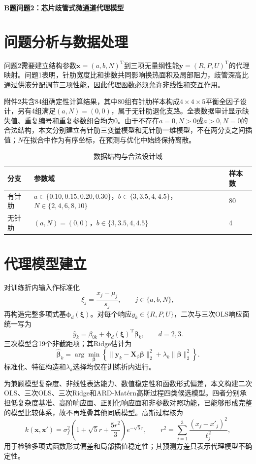 \documentclass[UTF8,12pt,a4paper]{ctexart}
\begin{document}
\setcounter{section}{9}

\begin{center}
{\LARGE\bfseries\color{navy} B题问题2：芯片歧管式微通道代理模型}
\end{center}

\section{问题分析与数据处理}
问题2需要建立结构参数$\bm x=(a,b,N)^{\mathrm T}$到三项无量纲性能$\bm y=(R,P,U)^{\mathrm T}$的代理映射。问题1表明，针肋宽度比和排数共同影响换热面积及局部阻力，歧管深高比通过供液分配调节三项性能，因此代理函数必须允许非线性和交互作用。

附件2共含84组确定性计算结果，其中80组有针肋样本构成$4\times4\times5$平衡全因子设计，另有4组满足$(a,N)=(0,0)$，属于无针肋退化支路。全表数据审计显示缺失值、重复编号和重复参数组合均为0。由于不存在$a=0,N>0$或$a>0,N=0$的合法结构，本文分别建立有针肋三变量模型和无针肋一维模型，不在两分支之间插值；$N$在拟合中作为有序坐标，在预测与优化中始终保持离散。

\begin{table}[H]\centering\small
\caption{数据结构与合法设计域}\label{tab:domain}
\begin{tabular}{lll}
\toprule
分支 & 参数域 & 样本数 \\
\midrule
有针肋 & $a\in\{0.10,0.15,0.20,0.30\}$，$b\in\{3,3.5,4,4.5\}$，$N\in\{2,4,6,8,10\}$ & 80 \\
无针肋 & $(a,N)=(0,0)$，$b\in\{3,3.5,4,4.5\}$ & 4 \\
\bottomrule
\end{tabular}
\end{table}

\section{代理模型建立}
对训练折内输入作标准化
\[
\xi_j=\frac{x_j-\mu_j}{s_j},\qquad j\in\{a,b,N\},
\]
再构造完整多项式基$\bm\phi_d(\bm\xi)$。对每个响应$y_k\in\{R,P,U\}$，二次与三次OLS响应面统一写为
\[
\widehat y_k=\beta_{0k}+\bm\phi_d(\bm\xi)^{\mathrm T}\bm\beta_k,\qquad d=2,3.
\]
三次模型含19个非截距项；其Ridge估计为
\[
\widehat{\bm\beta}_k=\arg\min_{\bm\beta}\left\{\|\bm y_k-\bm X_\phi\bm\beta\|_2^2+\lambda_k\|\bm\beta\|_2^2\right\}.
\]
标准化、特征构造和$\lambda_k$选择均仅在训练折内进行。

为兼顾模型复杂度、非线性表达能力、数值稳定性和函数形式偏差，本文构建二次OLS、三次OLS、三次Ridge和ARD-Matérn高斯过程四类候选模型。四者分别承担低复杂度基准、高阶响应面、正则化响应面和非参数对照功能，已能够形成完整的模型比较体系，故不再堆叠其他同质模型。高斯过程核为
\[
k(\bm x,\bm x')=\sigma_f^2\left(1+\sqrt5r+\frac{5r^2}{3}\right)e^{-\sqrt5r},\qquad
r^2=\sum_{j=1}^3\frac{(x_j-x'_j)^2}{\ell_j^2},
\]
用于检验多项式函数形式偏差和局部插值稳定性；其预测方差只表示代理模型不确定性。
\end{document}
